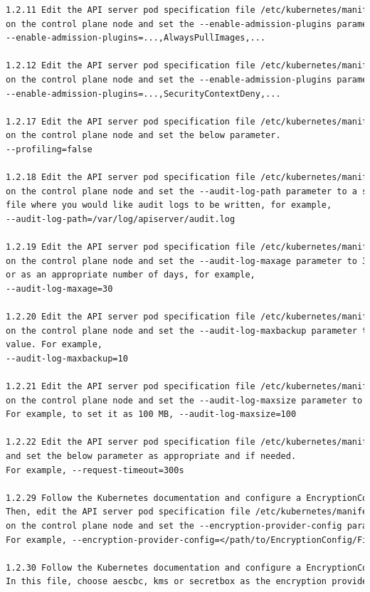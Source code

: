 \begin{lstlisting}[language=tex, caption={Remediations master van kube-bench}]
1.2.11 Edit the API server pod specification file /etc/kubernetes/manifests/kube-apiserver.yaml
on the control plane node and set the --enable-admission-plugins parameter to include
--enable-admission-plugins=...,AlwaysPullImages,...

1.2.12 Edit the API server pod specification file /etc/kubernetes/manifests/kube-apiserver.yaml
on the control plane node and set the --enable-admission-plugins parameter to include
--enable-admission-plugins=...,SecurityContextDeny,...

1.2.17 Edit the API server pod specification file /etc/kubernetes/manifests/kube-apiserver.yaml
on the control plane node and set the below parameter.
--profiling=false

1.2.18 Edit the API server pod specification file /etc/kubernetes/manifests/kube-apiserver.yaml
on the control plane node and set the --audit-log-path parameter to a suitable path and
file where you would like audit logs to be written, for example,
--audit-log-path=/var/log/apiserver/audit.log

1.2.19 Edit the API server pod specification file /etc/kubernetes/manifests/kube-apiserver.yaml
on the control plane node and set the --audit-log-maxage parameter to 30
or as an appropriate number of days, for example,
--audit-log-maxage=30

1.2.20 Edit the API server pod specification file /etc/kubernetes/manifests/kube-apiserver.yaml
on the control plane node and set the --audit-log-maxbackup parameter to 10 or to an appropriate
value. For example,
--audit-log-maxbackup=10

1.2.21 Edit the API server pod specification file /etc/kubernetes/manifests/kube-apiserver.yaml
on the control plane node and set the --audit-log-maxsize parameter to an appropriate size in MB.
For example, to set it as 100 MB, --audit-log-maxsize=100

1.2.22 Edit the API server pod specification file /etc/kubernetes/manifests/kube-apiserver.yaml
and set the below parameter as appropriate and if needed.
For example, --request-timeout=300s

1.2.29 Follow the Kubernetes documentation and configure a EncryptionConfig file.
Then, edit the API server pod specification file /etc/kubernetes/manifests/kube-apiserver.yaml
on the control plane node and set the --encryption-provider-config parameter to the path of that file.
For example, --encryption-provider-config=</path/to/EncryptionConfig/File>

1.2.30 Follow the Kubernetes documentation and configure a EncryptionConfig file.
In this file, choose aescbc, kms or secretbox as the encryption provider.


\end{lstlisting}

